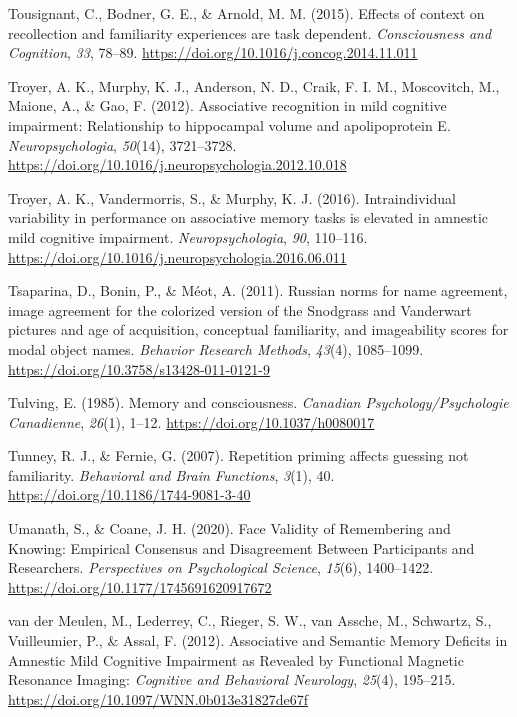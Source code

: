 \documentclass[
  11pt,
]{article}
\begin{document}
\leavevmode\hypertarget{ref-tousignant2015}{}%
Tousignant, C., Bodner, G. E., \& Arnold, M. M. (2015). Effects of
context on recollection and familiarity experiences are task dependent.
\emph{Consciousness and Cognition}, \emph{33}, 78--89.
\url{https://doi.org/10.1016/j.concog.2014.11.011}

\leavevmode\hypertarget{ref-troyer2012}{}%
Troyer, A. K., Murphy, K. J., Anderson, N. D., Craik, F. I. M.,
Moscovitch, M., Maione, A., \& Gao, F. (2012). Associative recognition
in mild cognitive impairment: Relationship to hippocampal volume and
apolipoprotein E. \emph{Neuropsychologia}, \emph{50}(14), 3721--3728.
\url{https://doi.org/10.1016/j.neuropsychologia.2012.10.018}

\leavevmode\hypertarget{ref-troyer2016}{}%
Troyer, A. K., Vandermorris, S., \& Murphy, K. J. (2016).
Intraindividual variability in performance on associative memory tasks
is elevated in amnestic mild cognitive impairment.
\emph{Neuropsychologia}, \emph{90}, 110--116.
\url{https://doi.org/10.1016/j.neuropsychologia.2016.06.011}

\leavevmode\hypertarget{ref-tsaparina2011}{}%
Tsaparina, D., Bonin, P., \& Méot, A. (2011). Russian norms for name
agreement, image agreement for the colorized version of the Snodgrass
and Vanderwart pictures and age of acquisition, conceptual familiarity,
and imageability scores for modal object names. \emph{Behavior Research
Methods}, \emph{43}(4), 1085--1099.
\url{https://doi.org/10.3758/s13428-011-0121-9}

\leavevmode\hypertarget{ref-tulving1985}{}%
Tulving, E. (1985). Memory and consciousness. \emph{Canadian
Psychology/Psychologie Canadienne}, \emph{26}(1), 1--12.
\url{https://doi.org/10.1037/h0080017}

\leavevmode\hypertarget{ref-tunney2007}{}%
Tunney, R. J., \& Fernie, G. (2007). Repetition priming affects guessing
not familiarity. \emph{Behavioral and Brain Functions}, \emph{3}(1), 40.
\url{https://doi.org/10.1186/1744-9081-3-40}

\leavevmode\hypertarget{ref-umanath2020}{}%
Umanath, S., \& Coane, J. H. (2020). Face Validity of Remembering and
Knowing: Empirical Consensus and Disagreement Between Participants and
Researchers. \emph{Perspectives on Psychological Science}, \emph{15}(6),
1400--1422. \url{https://doi.org/10.1177/1745691620917672}

\leavevmode\hypertarget{ref-vandermeulen2012}{}%
van der Meulen, M., Lederrey, C., Rieger, S. W., van Assche, M.,
Schwartz, S., Vuilleumier, P., \& Assal, F. (2012). Associative and
Semantic Memory Deficits in Amnestic Mild Cognitive Impairment as
Revealed by Functional Magnetic Resonance Imaging: \emph{Cognitive and
Behavioral Neurology}, \emph{25}(4), 195--215.
\url{https://doi.org/10.1097/WNN.0b013e31827de67f}
\end{document}
